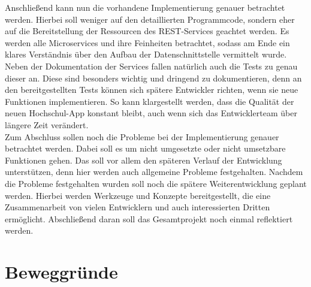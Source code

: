 \linebreak
Anschließend kann nun die vorhandene Implementierung genauer betrachtet werden. Hierbei soll weniger auf den detaillierten Programmcode, sondern eher auf die Bereitstellung der Ressourcen des \ac{REST}-Services geachtet werden. Es werden alle Microservices und ihre Feinheiten betrachtet, sodass am Ende ein klares Verständnis über den Aufbau der Datenschnittstelle vermittelt wurde. Neben der Dokumentation der Services fallen natürlich auch die Tests zu genau dieser an. Diese sind besonders wichtig und dringend zu dokumentieren, denn an den bereitgestellten Tests können sich spätere Entwickler richten, wenn sie neue Funktionen implementieren. So kann klargestellt werden, dass die Qualität der neuen Hochschul-\ac{App} konstant bleibt, auch wenn sich das Entwicklerteam über längere Zeit verändert.\\
\linebreak
Zum Abschluss sollen noch die Probleme bei der Implementierung genauer betrachtet werden. Dabei soll es um nicht umgesetzte oder nicht umsetzbare Funktionen gehen. Das soll vor allem den späteren Verlauf der Entwicklung unterstützen, denn hier werden auch allgemeine Probleme festgehalten. Nachdem die Probleme festgehalten wurden soll noch die spätere Weiterentwicklung geplant werden. Hierbei werden Werkzeuge und Konzepte bereitgestellt, die eine Zusammenarbeit von vielen Entwicklern und auch interessierten Dritten ermöglicht. Abschließend daran soll das Gesamtprojekt noch einmal reflektiert werden.

\section{Beweggründe}

